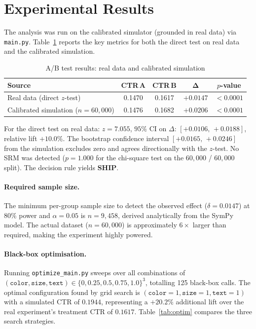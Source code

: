 \documentclass[a4paper,12pt]{extarticle}
\numberwithin{equation}{section}
\begin{document}
\clearpage

\section*{Experimental Results}

The analysis was run on the calibrated simulator (grounded in
real data) via \texttt{main.py}. Table~\ref{tab:results}
reports the key metrics for both the direct test on real data
and the calibrated simulation.

\begin{table}[ht]
\centering
\caption{A/B test results: real data and calibrated simulation}
\label{tab:results}
\begin{tabular}{lcccc}
\toprule
\textbf{Source} & \textbf{CTR\,A} & \textbf{CTR\,B}
    & $\boldsymbol{\Delta}$ & \textbf{$p$-value} \\
\midrule
Real data (direct $z$-test)            & 0.1470 & 0.1617 & $+0.0147$ & $<0.0001$ \\
Calibrated simulation ($n=60{,}000$)   & 0.1476 & 0.1682 & $+0.0206$ & $<0.0001$ \\
\bottomrule
\end{tabular}
\end{table}

For the direct test on real data: $z = 7.055$, $95\%$
CI on $\Delta$: $[+0.0106,\, +0.0188]$, relative lift $+10.0\%$.
The bootstrap confidence interval $[+0.0165,\, +0.0246]$
from the simulation excludes zero and agrees directionally with
the $z$-test. No SRM was detected ($p = 1.000$ for the
chi-square test on the $60{,}000$ / $60{,}000$ split).
The decision rule yields \textbf{SHIP}.

\paragraph{Required sample size.} The minimum per-group sample
size to detect the observed effect ($\delta = 0.0147$) at
$80\%$ power and $\alpha = 0.05$ is $n = 9{,}458$, derived
analytically from the SymPy model. The actual dataset
($n = 60{,}000$) is approximately $6\times$ larger than
required, making the experiment highly powered.

\paragraph{Black-box optimisation.} Running \texttt{optimize\_main.py}
sweeps over all combinations of $(\texttt{color}, \texttt{size},
\texttt{text}) \in \{0, 0.25, 0.5, 0.75, 1.0\}^3$, totalling
125 black-box calls. The optimal configuration found by grid
search is $(\texttt{color}=1, \texttt{size}=1, \texttt{text}=1)$
with a simulated CTR of $0.1944$, representing a $+20.2\%$
additional lift over the real experiment's treatment CTR of
$0.1617$. Table~\ref{tab:optim} compares the three search
strategies.
\end{document}
